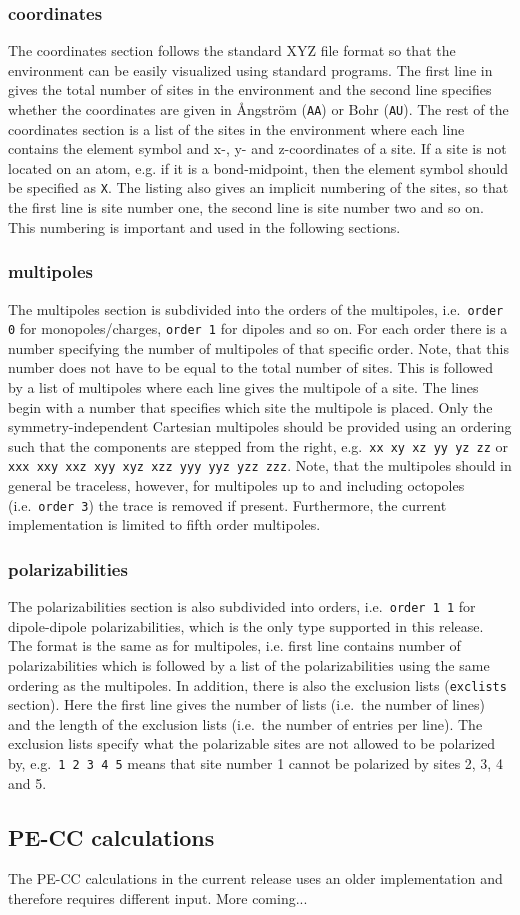 \subsubsection*{coordinates}
The coordinates section follows the standard XYZ file format so that the environment can be easily visualized using standard programs. The first line in gives the total number of sites in the environment and the second line specifies whether the coordinates are given in \AA{}ngstr\"{o}m (\verb|AA|) or Bohr (\verb|AU|). The rest of the coordinates section is a list of the sites in the environment where each line contains the element symbol and x-, y- and z-coordinates of a site. If a site is not located on an atom, e.g. if it is a bond-midpoint, then the element symbol should be specified as \verb|X|. The listing also gives an implicit numbering of the sites, so that the first line is site number one, the second line is site number two and so on. This numbering is important and used in the following sections.

\subsubsection*{multipoles}
The multipoles section is subdivided into the orders of the multipoles, i.e.\ \verb|order 0| for monopoles/charges, \verb|order 1| for dipoles and so on. For each order there is a number specifying the number of multipoles of that specific order. Note, that this number does not have to be equal to the total number of sites. This is followed by a list of multipoles where each line gives the multipole of a site. The lines begin with a number that specifies which site the multipole is placed. Only the symmetry-independent Cartesian multipoles should be provided using an ordering such that the components are stepped from the right, e.g.\ \verb|xx xy xz yy yz zz| or \verb|xxx xxy xxz xyy xyz xzz yyy yyz yzz zzz|. Note, that the multipoles should in general be traceless, however, for multipoles up to and including octopoles (i.e.\ \verb|order 3|) the trace is removed if present. Furthermore, the current implementation is limited to fifth order multipoles.

\subsubsection*{polarizabilities}
The polarizabilities section is also subdivided into orders, i.e.\ \verb|order 1 1| for dipole-dipole polarizabilities, which is the only type supported in this release. The format is the same as for multipoles, i.e. first line contains number of polarizabilities which is followed by a list of the polarizabilities using the same ordering as the multipoles. In addition, there is also the exclusion lists (\verb|exclists| section). Here the first line gives the number of lists (i.e.\ the number of lines) and the length of the exclusion lists (i.e.\ the number of entries per line). The exclusion lists specify what the polarizable sites are not allowed to be polarized by, e.g.\ \verb|1 2 3 4 5| means that site number 1 cannot be polarized by sites 2, 3, 4 and 5.

\subsection{PE-CC calculations}\label{sec:pecc}
The PE-CC calculations in the current release uses an older implementation and therefore requires different input. More coming...